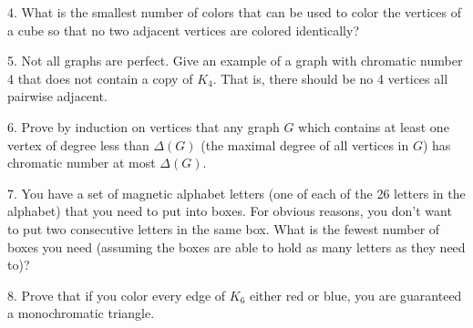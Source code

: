 \documentclass[10pt,]{book}
\theoremstyle{plain}
\theoremstyle{definition}
\theoremstyle{definition}
\theoremstyle{definition}
\numberwithin{equation}{chapter}
\begin{document}
\begin{exerciselist}
\par\smallskip
\item[4.]\hypertarget{exercise-283}{}
What is the smallest number of colors that can be used to color the vertices of a cube so that no two adjacent vertices are colored identically?
%
\par\smallskip
\item[5.]\hypertarget{exercise-284}{}
Not all graphs are perfect. Give an example of a graph with chromatic number 4 that does not contain a copy of \(K_4\). That is, there should be no 4 vertices all pairwise adjacent.
%
\par\smallskip
\item[6.]\hypertarget{exercise-285}{}
Prove by induction on vertices that any graph \(G\) which contains at least one vertex of degree less than \(\Delta(G)\) (the maximal degree of all vertices in \(G\)) has chromatic number at most \(\Delta(G)\).
%
\par\smallskip
\item[7.]\hypertarget{exercise-286}{}
You have a set of magnetic alphabet letters (one of each of the 26 letters in the alphabet) that you need to put into boxes. For obvious reasons, you don't want to put two consecutive letters in the same box. What is the fewest number of boxes you need (assuming the boxes are able to hold as many letters as they need to)?
%
\par\smallskip
\item[8.]\hypertarget{exercise-287}{}
Prove that if you color every edge of \(K_6\) either red or blue, you are guaranteed a monochromatic triangle.
%
\par\smallskip
\end{exerciselist}
\typeout{************************************************}
\typeout{************************************************}
\end{document}
